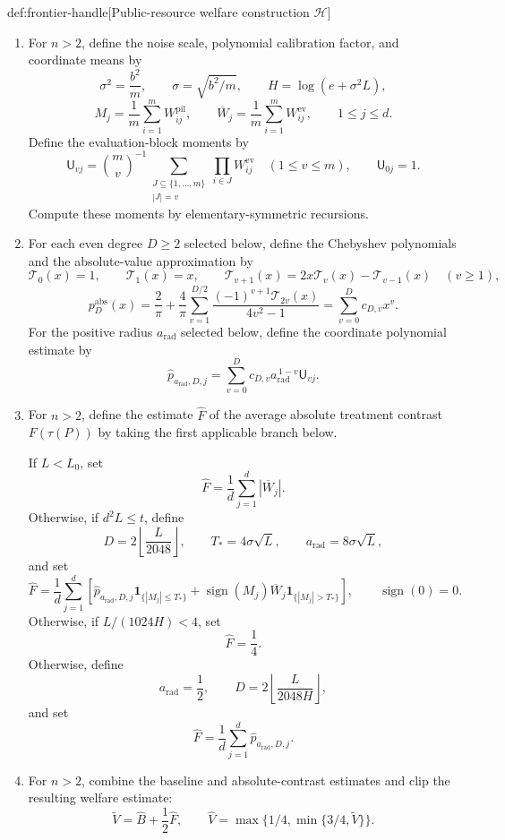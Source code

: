 \documentclass[11pt]{article}
\begin{document}
\begin{algorithmv}{def:frontier-handle}[Public-resource welfare construction $\mathscr H$]
\begin{enumerate}
\item For \(n>2\), define the noise scale, polynomial calibration factor, and coordinate means by
\[
\sigma^2=\frac{b^2}{m},
\qquad \sigma=\sqrt{b^2/m},
\qquad H=\log(e+\sigma^2L),
\]
\[
M_j=\frac1m\sum_{i=1}^m W^{\mathrm{pil}}_{ij},
\qquad
\overline W_j=\frac1m\sum_{i=1}^m W^{\mathrm{ev}}_{ij},
\qquad 1\le j\le d.
\]
Define the evaluation-block moments by
\[
\mathsf U_{vj}
=
\binom{m}{v}^{-1}
\sum_{\substack{J\subseteq\{1,\ldots,m\}\\ |J|=v}}
\prod_{i\in J}W^{\mathrm{ev}}_{ij}
\quad(1\le v\le m),
\qquad
\mathsf U_{0j}=1.
\]
Compute these moments by elementary-symmetric recursions.

\item For each even degree \(D\ge2\) selected below, define the Chebyshev polynomials and the absolute-value approximation by
\[
\mathcal T_0(x)=1,
\qquad \mathcal T_1(x)=x,
\qquad
\mathcal T_{v+1}(x)
=2x\mathcal T_v(x)-\mathcal T_{v-1}(x)
\quad(v\ge1),
\]
\[
p_D^{\mathrm{abs}}(x)
=
\frac2\pi+\frac4\pi\sum_{v=1}^{D/2}
\frac{(-1)^{v+1}\mathcal T_{2v}(x)}{4v^2-1}
=
\sum_{v=0}^D c_{D,v}x^v.
\]
For the positive radius \(a_{\mathrm{rad}}\) selected below, define the coordinate polynomial estimate by
\[
\widehat p_{a_{\mathrm{rad}},D,j}
=
\sum_{v=0}^D
c_{D,v}a_{\mathrm{rad}}^{\,1-v}\mathsf U_{vj}.
\]

\item For \(n>2\), define the estimate \(\widehat F\) of the average absolute treatment contrast \(F(\tau(P))\) by taking the first applicable branch below.

If \(L<L_0\), set
\[
\widehat F=\frac1d\sum_{j=1}^d|\overline W_j|.
\]
Otherwise, if \(d^2L\le t\), define
\[
D=2\left\lfloor\frac{L}{2048}\right\rfloor,
\qquad T_*=4\sigma\sqrt L,
\qquad a_{\mathrm{rad}}=8\sigma\sqrt L,
\]
and set
\[
\widehat F
=
\frac1d\sum_{j=1}^d
\left[
\widehat p_{a_{\mathrm{rad}},D,j}
\mathbf1_{\{|M_j|\le T_*\}}
+
\operatorname{sign}(M_j)\overline W_j
\mathbf1_{\{|M_j|>T_*\}}
\right],
\qquad \operatorname{sign}(0)=0.
\]
Otherwise, if \(L/(1024H)<4\), set
\[
\widehat F=\frac14.
\]
Otherwise, define
\[
a_{\mathrm{rad}}=\frac12,
\qquad
D=2\left\lfloor\frac{L}{2048H}\right\rfloor,
\]
and set
\[
\widehat F
=\frac1d\sum_{j=1}^d
\widehat p_{a_{\mathrm{rad}},D,j}.
\]

\item For \(n>2\), combine the baseline and absolute-contrast estimates and clip the resulting welfare estimate:
\[
\widetilde V=\widehat B+\frac12\widehat F,
\qquad
\widehat V=\max\{1/4,\min\{3/4,\widetilde V\}\}.
\]


\end{enumerate}
\end{algorithmv}
\end{document}
